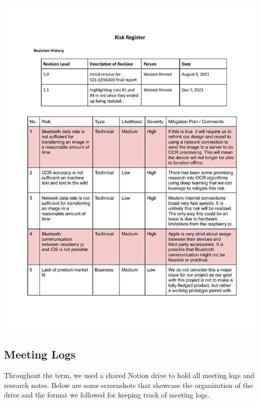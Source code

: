 \documentclass[a4paper,11pt]{article}
\begin{document}
\includegraphics[page=2,width={1.0\linewidth}]{pdf/risk-register-1.1.pdf}

\newpage
\subsection{Meeting Logs}
\label{meeting-logs}
Throughout the term, we used a shared Notion drive to hold all meeting logs and research notes.
Below are some screenshots that showcase the organization of the drive and the format we followed for keeping track of meeting logs.
\end{document}
